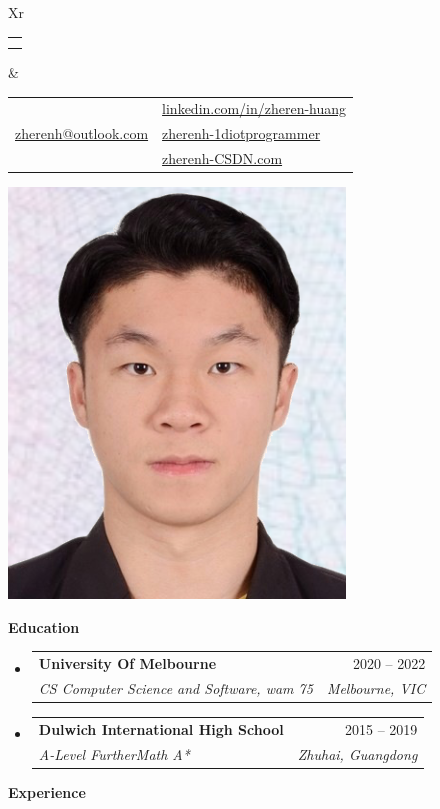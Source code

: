 \documentclass[letterpaper,12pt]{article}[leftmargin=*]
\makeatletter
\def \fullname {Zheren Huang}
\def \subtitle {}
\def \linkedinicon {\faLinkedin}
\def \linkedinlink {https://linkedin.com/in/zheren-huang-9133a6235/}
\def \linkedintext {linkedin.com/in/zheren-huang}
\def \phoneicon {\faPhone}
\def \phonetext {+61 466641756}
\def \emailicon {\faEnvelope}
\def \emaillink {mailto:zherenh@outlook.com}
\def \emailtext {zherenh@outlook.com}
\def \githubicon {\faGithub}
\def \githublink {https://github.com/1diotprogrammer}
\def \githubtext {zherenh-1diotprogrammer}
\def \websiteicon {\faGlobe}
\def \websitelink {https://blog.csdn.net/ooooobx?spm=1000.2115.3001.5343}
\def \websitetext {zherenh-CSDN.com}
\def \headertype {\doublecol} %
\def \entryspacing {-0pt}
\def \linkedin {\linkedinicon \hspace{3pt}\href{\linkedinlink}{\linkedintext}}
\def \phone {\phoneicon \hspace{3pt}{ \phonetext}}
\def \email {\emailicon \hspace{3pt}\href{\emaillink}{\emailtext}}
\def \github {\githubicon \hspace{3pt}\href{\githublink}{\githubtext}}
\def \website {\websiteicon \hspace{3pt}\href{\websitelink}{\websitetext}}
\renewcommand{\section}[2]{\vspace{5pt}
  \colorbox{secondary}{\color{white}\raggedbottom\normalsize\textbf{{#1}{\hspace{7pt}#2}}}
}
\newcommand{\resumeEntryStart}{\begin{itemize}[leftmargin=2.5mm]}
\newcommand{\resumeEntryEnd}{\end{itemize}\vspace{\entryspacing}}
\newcommand{\resumeEntryTSDL}[4]{
  \vspace{-1pt}\item[]
    \begin{tabularx}{0.97\textwidth}{X@{\hspace{60pt}}r}
      \textbf{\color{primary}#1} & {\firabook\color{accent}\small#2} \\
      \textit{\color{accent}\small#3} & \textit{\color{accent}\small#4} \\
    \end{tabularx}\vspace{-6pt}
}
\newcommand{\doublecol}[6]{
  \begin{tabularx}{\textwidth}{Xr}
    {
      \begin{tabular}[c]{l}
        \fontsize{35}{45}\selectfont{\color{primary}{{\textbf{\fullname}}}} \\
        {\textit{\subtitle}} %
      \end{tabular}
    } & {
      \begin{tabular}[c]{l@{\hspace{1.5em}}l}
        {\small#4} & {\small#1} \\
        {\small#5} & {\small#2} \\
        {\small#6} & {\small#3}
      \end{tabular}
    }
  \end{tabularx}
}
\newcommand{\singlecol}[6]{
  \begin{tabularx}{\textwidth}{Xr}
    {
      \begin{tabular}[b]{l}
        \fontsize{35}{45}\selectfont{\color{primary}{{\textbf{\fullname}}}} \\
        {\textit{\subtitle}} %
      \end{tabular}
    } & {
      \begin{tabular}[c]{l}
        {\small#1} \\
        {\small#2} \\
        {\small#3} \\
        {\small#4} \\
        {\small#5} \\
        {\small#6}
      \end{tabular}
    }
  \end{tabularx}
}
\makeatother
\begin{document}


\headertype{\linkedin}{\github}{\website}{\phone}{\email}{} %
\vspace{-10pt} %


  \includegraphics[scale=0.4]{IDPhoto.jpg}

\section{\faGraduationCap}{Education}

  \resumeEntryStart
    \resumeEntryTSDL
      {University Of Melbourne}{2020 -- 2022}
      {CS Computer Science and Software, wam 75}{Melbourne, VIC}
  \resumeEntryEnd
  
  \resumeEntryStart
    \resumeEntryTSDL
      {Dulwich International High School}{2015 -- 2019}
      {A-Level FurtherMath A*}{Zhuhai, Guangdong}
  \resumeEntryEnd


\section{\faPieChart}{Experience}
\end{document}
